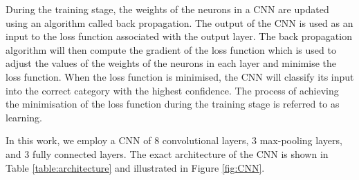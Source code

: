 \documentclass[aps,twocolumn,showpacs,groupedaddress, nofootinbib]{revtex4}  %
\begin{document}
During the training stage, the weights of the neurons in a \ac{CNN} are updated using an algorithm called back propagation\cite{lecun1988theoretical}.
The output of the \ac{CNN} is used as an input to the loss function associated with the output layer. 
The back propagation algorithm will then compute the gradient of the loss function 
which is used to adjust the values of the weights of the neurons in each layer and minimise the loss function.
When the loss function is minimised, the \ac{CNN} will classify its input into the correct category with the highest confidence. 
The process of achieving the minimisation of the loss function during the training stage is referred to as learning.

In this work, we employ a \ac{CNN} of $8$ convolutional layers, $3$ max-pooling layers, and $3$ fully connected layers.
The exact architecture of the \ac{CNN} is shown in Table \ref{table:architecture} and illustrated in Figure \ref{fig:CNN}.
\end{document}
